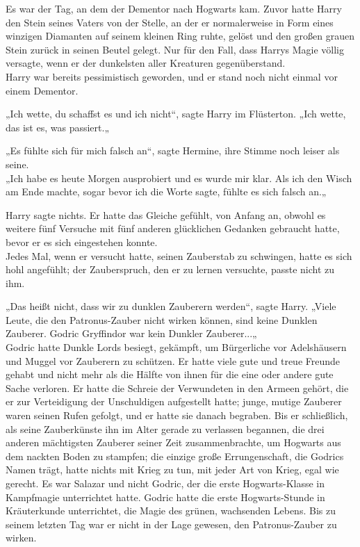 {Es war der Tag, an dem der Dementor nach Hogwarts kam. Zuvor hatte Harry den Stein seines Vaters von der Stelle, an der er normalerweise in Form eines winzigen Diamanten auf seinem kleinen Ring ruhte, gelöst und den großen grauen Stein zurück in seinen Beutel gelegt. Nur für den Fall, dass Harrys Magie völlig versagte, wenn er der dunkelsten aller Kreaturen gegenüberstand.\\ Harry war bereits pessimistisch geworden, und er stand noch nicht einmal vor einem Dementor.

„Ich wette, du schaffst es und ich nicht“, sagte Harry im Flüsterton. „Ich wette, das ist es, was passiert.„

„Es fühlte sich für mich falsch an“, sagte Hermine, ihre Stimme noch leiser als seine.\\ „Ich habe es heute Morgen ausprobiert und es wurde mir klar. Als ich den Wisch am Ende machte, sogar bevor ich die Worte sagte, fühlte es sich falsch an.„

Harry sagte nichts. Er hatte das Gleiche gefühlt, von Anfang an, obwohl es weitere fünf Versuche mit fünf anderen glücklichen Gedanken gebraucht hatte, bevor er es sich eingestehen konnte.\\ Jedes Mal, wenn er versucht hatte, seinen Zauberstab zu schwingen, hatte es sich hohl angefühlt; der Zauberspruch, den er zu lernen versuchte, passte nicht zu ihm.

„Das heißt nicht, dass wir zu dunklen Zauberern werden“, sagte Harry. „Viele Leute, die den Patronus-Zauber nicht wirken können, sind keine Dunklen Zauberer. Godric Gryffindor war kein Dunkler Zauberer...„\\ Godric hatte Dunkle Lords besiegt, gekämpft, um Bürgerliche vor Adelshäusern und Muggel vor Zauberern zu schützen. Er hatte viele gute und treue Freunde gehabt und nicht mehr als die Hälfte von ihnen für die eine oder andere gute Sache verloren. Er hatte die Schreie der Verwundeten in den Armeen gehört, die er zur Verteidigung der Unschuldigen aufgestellt hatte; junge, mutige Zauberer waren seinen Rufen gefolgt, und er hatte sie danach begraben. Bis er schließlich, als seine Zauberkünste ihn im Alter gerade zu verlassen begannen, die drei anderen mächtigsten Zauberer seiner Zeit zusammenbrachte, um Hogwarts aus dem nackten Boden zu stampfen; die einzige große Errungenschaft, die Godrics Namen trägt, hatte nichts mit Krieg zu tun, mit jeder Art von Krieg, egal wie gerecht. Es war Salazar und nicht Godric, der die erste Hogwarts-Klasse in Kampfmagie unterrichtet hatte. Godric hatte die erste Hogwarts-Stunde in Kräuterkunde unterrichtet, die Magie des grünen, wachsenden Lebens. Bis zu seinem letzten Tag war er nicht in der Lage gewesen, den Patronus-Zauber zu wirken.

}
